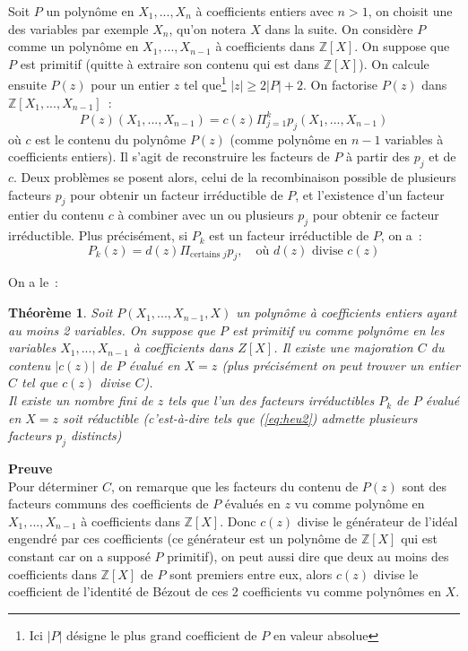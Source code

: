\documentclass[a4paper,11pt]{article}
\newtheorem{thm}{Théorème}
\newcommand{\Z}{{\mathbb{Z}}}
\begin{document}
Soit $P$ un polynôme en $X_1,...,X_n$ à coefficients entiers avec $n>1$,
on choisit une des variables par exemple $X_n$, qu'on notera $X$ dans la suite.
On considère $P$ comme un polynôme en $X_1,...,X_{n-1}$ à coefficients dans 
$\Z[X]$. On suppose que $P$ est primitif (quitte à extraire
son contenu qui est dans $\Z[X]$). On calcule ensuite
$P(z)$ pour un entier $z$ tel que\footnote{Ici $|P|$ désigne le plus grand
coefficient de $P$ en valeur absolue} $|z| \geq 2|P|+2$. On factorise $P(z)$
dans $\Z[X_1,...,X_{n-1}]$~:
\begin{equation} \label{eq:heu1}
 P(z)(X_1,...,X_{n-1})=c(z) \Pi_{j=1}^k p_j(X_1,...,X_{n-1})
\end{equation}
où $c$ est le contenu du polynôme $P(z)$ (comme polynôme en $n-1$ 
variables à coefficients entiers). Il s'agit de reconstruire les facteurs
de $P$ à partir des $p_j$ et de $c$. Deux problèmes se posent alors,
celui de la recombinaison possible de plusieurs facteurs $p_j$ pour
obtenir un facteur irréductible de $P$, et l'existence d'un facteur entier du
contenu $c$ à combiner avec un ou plusieurs $p_j$ pour obtenir ce
facteur irréductible. Plus précisément, si $P_k$ est un facteur 
irréductible de $P$, on a~:
\begin{equation} \label{eq:heu2}
 P_k(z)=d(z) \Pi_{\mbox{certains } j} p_j, \quad \mbox{où } 
d(z) \mbox{ divise } c(z)
\end{equation}

On a le~:
\begin{thm}
Soit $P(X_1,...,X_{n-1},X)$ un polynôme à coefficients 
entiers ayant au moins 2 variables. On suppose que $P$ est primitif
vu comme polynôme en les variables $X_1,...,X_{n-1}$
à coefficients dans $Z[X]$.
Il existe une majoration $C$ du contenu $|c(z)|$ de $P$ évalué en $X=z$
(plus précisément on peut trouver un entier $C$ tel que $c(z)$ divise
$C$).\\
Il existe un nombre fini de $z$ tels que l'un des facteurs irréductibles
$P_k$ de $P$ évalué en $X=z$ soit
réductible (c'est-à-dire tels que (\ref{eq:heu2}) admette 
plusieurs facteurs $p_j$ distincts)
\end{thm}

{\bf Preuve}\\
Pour déterminer $C$, on remarque que les facteurs du contenu de $P(z)$
sont des facteurs communs des coefficients de $P$ évalués en $z$
vu comme polynôme en $X_1,...,X_{n-1}$ à coefficients dans $\Z[X]$.
Donc $c(z)$ divise le générateur de l'idéal engendré par ces coefficients
(ce générateur est un polynôme de $\Z[X]$ qui est constant car on a supposé
$P$ primitif), on peut aussi dire que deux au moins des coefficients
dans $\Z[X]$ de $P$ sont premiers entre eux, alors $c(z)$ divise le
coefficient de l'identité de Bézout de ces 2 coefficients vu
comme polynômes en $X$.
\end{document}
